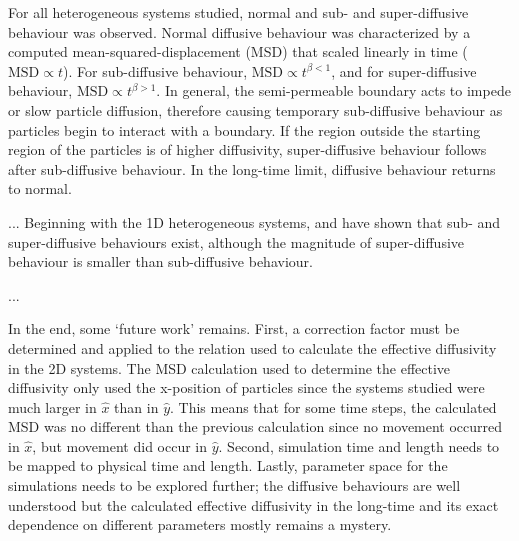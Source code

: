 	For all heterogeneous systems studied, normal and sub- and super-diffusive behaviour was observed. Normal diffusive behaviour was characterized by a computed mean-squared-displacement (MSD) that scaled linearly in time ($ \textrm{MSD} \propto t $). For sub-diffusive behaviour, $ \textrm{MSD} \propto t^{\beta < 1} $, and for super-diffusive behaviour, $ \textrm{MSD} \propto t^{\beta > 1} $. In general, the semi-permeable boundary acts to impede or slow particle diffusion, therefore causing temporary sub-diffusive behaviour as particles begin to interact with a boundary. If the region outside the starting region of the particles is of higher diffusivity, super-diffusive behaviour follows after sub-diffusive behaviour. In the long-time limit, diffusive behaviour returns to normal.
	
	...
	Beginning with the 1D heterogeneous systems, and have shown that sub- and super-diffusive behaviours exist, although the magnitude of super-diffusive behaviour is smaller than sub-diffusive behaviour.
	
	...
	
	In the end, some `future work' remains. First, a correction factor must be determined and applied to the relation used to calculate the effective diffusivity in the 2D systems. The MSD calculation used to determine the effective diffusivity only used the x-position of particles since the systems studied were much larger in $ \hat{x} $ than in $ \hat{y} $. This means that for some time steps, the calculated MSD was no different than the previous calculation since no movement occurred in $ \hat{x} $, but movement did occur in $ \hat{y} $. Second, simulation time and length needs to be mapped to physical time and length. Lastly, parameter space for the simulations needs to be explored further; the diffusive behaviours are well understood but the calculated effective diffusivity in the long-time and its exact dependence on different parameters mostly remains a mystery.